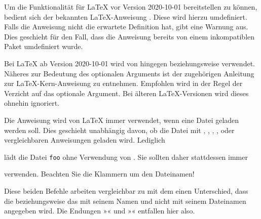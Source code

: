 Um die Funktionalität für \LaTeX{} vor Version 2020-10-01 bereitstellen zu
können, bedient sich  der bekannten
\LaTeX-Anweisung . Diese wird
hierzu umdefiniert.  Falls die Anweisung nicht die erwartete Definition hat,
gibt  eine Warnung aus.  Dies geschieht für
den Fall, dass die Anweisung bereits von einem inkompatiblen Paket umdefiniert
wurde.

Bei \LaTeX{} ab
Version 2020-10-01 wird von  hingegen
beziehungsweise
verwendet. Näheres zur Bedeutung des optionalen Arguments  ist
der zugehörigen Anleitung zur \LaTeX-Kern-Anweisung  zu
entnehmen. Empfohlen wird in der Regel der Verzicht auf das optionale
Argument. Bei älteren \LaTeX-Versionen wird dieses ohnehin ignoriert.

Die Anweisung  wird von \LaTeX{} immer verwendet,
wenn eine Datei geladen werden soll. Dies geschieht unabhängig davon, ob die
Datei mit , , ,
,  oder vergleichbaren Anweisungen
geladen wird. Lediglich
\begin{lstcode}
  
\end{lstcode}
lädt die Datei \texttt{foo} ohne Verwendung von . Sie
sollten daher stattdessen immer
\begin{lstcode}
  
\end{lstcode}
verwenden. Beachten Sie die Klammern um den Dateinamen!%
%
\EndIndexGroup


\begin{Declaration}
\end{Declaration}%
Diese beiden Befehle arbeiten vergleichbar zu
 mit dem einen Unterschied, dass die
 beziehungsweise das  mit seinem Namen und nicht
mit seinem Dateinamen angegeben wird. Die Endungen »« und
»« entfallen hier also.

